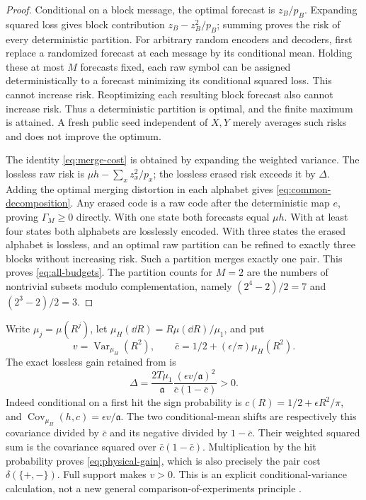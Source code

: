 \documentclass[11pt]{amsart}
\theoremstyle{definition}\newtheorem{definition}[theorem]{Definition}
\theoremstyle{remark}\newtheorem{remark}[theorem]{Remark}
\DeclareMathOperator{\Var}{Var}\DeclareMathOperator{\Cov}{Cov}
\begin{document}
\begin{proof}
Conditional on a block message, the optimal forecast is $z_B/p_B$.
Expanding squared loss gives block contribution
$z_B-z_B^2/p_B$; summing proves the risk of every deterministic partition.
For arbitrary random encoders and decoders, first replace a randomized
forecast at each message by its conditional mean. Holding these at most
$M$ forecasts fixed, each raw symbol can be assigned deterministically to
a forecast minimizing its conditional squared loss. This cannot increase
risk. Reoptimizing each resulting block forecast also cannot increase risk.
Thus a deterministic partition is optimal, and the finite maximum is
attained. A fresh public seed independent of $X,Y$ merely averages such
risks and does not improve the optimum.

The identity \eqref{eq:merge-cost} is obtained by expanding the weighted
variance. The lossless raw risk is $\mu h-\sum_x z_x^2/p_x$; the
lossless erased risk exceeds it by $\Delta$. Adding the optimal merging
distortion in each alphabet gives \eqref{eq:common-decomposition}.
Any erased code is a raw code after the deterministic map $e$, proving
$\Gamma_M\ge0$ directly. With one state both forecasts equal $\mu h$.
With at least four states both alphabets are losslessly encoded. With
three states the erased alphabet is lossless, and an optimal raw partition
can be refined to exactly three blocks without increasing risk. Such a
partition merges exactly one pair. This proves \eqref{eq:all-budgets}.
The partition counts for $M=2$ are the numbers of nontrivial subsets
modulo complementation, namely $(2^4-2)/2=7$ and $(2^3-2)/2=3$.
\end{proof}

Write $\mu_j=\mu(R^j)$, let
$\mu_H(\dd R)=R\mu(\dd R)/\mu_1$, and put
\[
 v=\Var_{\mu_H}(R^2),\qquad
 \bar c=1/2+(\epsilon/\pi)\mu_H(R^2).
\]
The exact lossless gain retained from \cite{A1v5} is
\begin{equation}\label{eq:physical-gain}
 \Delta=\frac{2T\mu_1}{\mathfrak a}
    \frac{(\epsilon v/\mathfrak a)^2}{\bar c(1-\bar c)}>0.
\end{equation}
Indeed conditional on a first hit the sign probability is
$c(R)=1/2+\epsilon R^2/\pi$, and
$\Cov_{\mu_H}(h,c)=\epsilon v/\mathfrak a$.
The two conditional-mean shifts are respectively this covariance divided
by $\bar c$ and its negative divided by $1-\bar c$.
Their weighted squared sum is the covariance squared over
$\bar c(1-\bar c)$. Multiplication by the hit probability proves
\eqref{eq:physical-gain}, which is also precisely the pair cost
$\delta(\{+,-\})$. Full support makes $v>0$. This is an explicit
conditional-variance calculation, not a new general comparison-of-experiments
principle \cite{Blackwell}.
\end{document}
